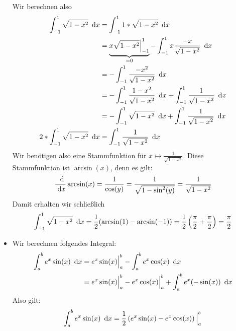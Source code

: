 \begin{itemize}
	Wir berechnen also
	\begin{align*}
		\int_{-1}^1\sqrt{1-x^2}\intd x
		&=\int_{-1}^1 1*\sqrt{1-x^2}\intd x\\
		&=\underbrace{x\sqrt{1-x^2}\Big|_{-1}^1}_{=0}-\int_{-1}^1 x\frac{-x}{\sqrt{1-x^2}}\intd x\\
		&=-\int_{-1}^1 \frac{-x^2}{\sqrt{1-x^2}}\intd x\\
		&=-\int_{-1}^1 \frac{1-x^2}{\sqrt{1-x^2}}\intd x+\int_{-1}^1 \frac{1}{\sqrt{1-x^2}}\intd x\\
		&=-\int_{-1}^1 \sqrt{1-x^2}\intd x+\int_{-1}^1 \frac{1}{\sqrt{1-x^2}}\intd x\\
		2*\int_{-1}^1\sqrt{1-x^2}\intd x
		&=\int_{-1}^1 \frac{1}{\sqrt{1-x^2}}\intd x\\
	\end{align*}
	Wir benötigen also eine Stammfunktion für $x\mapsto\frac{1}{\sqrt{1-x^2}}$. Diese Stammfunktion ist $\arcsin(x)$, denn es gilt:
	\begin{equation*}
		\frac{\ \operatorname{d}\!}{\ \operatorname{d}\! x}\arcsin(x)=\frac{1}{\cos(y)}=\frac{1}{\sqrt{1-\sin^2(y)}}=\frac{1}{\sqrt{1-x^2}}
	\end{equation*}
	Damit erhalten wir schließlich
	\begin{equation*}
		\int_{-1}^1\sqrt{1-x^2}\ \operatorname{d}\! x=\frac12(\arcsin(1)-\arcsin(-1))=\frac12\left(\frac\pi2+\frac\pi2\right)=\frac\pi2
	\end{equation*}
	\item Wir berechnen folgendes Integral:
	\begin{align*}
		\int_a^b e^x \sin(x) \ \operatorname{d}\! x
		&=e^x\sin(x)\Big|_a^b-\int_a^b e^x\cos(x)\ \operatorname{d}\! x\\
		&=e^x\sin(x)\Big|_a^b - e^x\cos(x)\Big|_a^b + \int_a^b e^x(-\sin(x))\ \operatorname{d}\! x
	\end{align*}
	Also gilt:
	\begin{equation*}
		\int_a^b e^x\sin(x)\ \operatorname{d}\! x=\frac12\left(e^x\sin(x)-e^x\cos(x)\right)\Big|_a^b
	\end{equation*}
\end{itemize}

